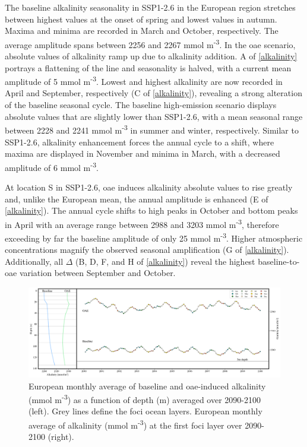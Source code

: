 The baseline alkalinity seasonality in SSP1-2.6 in the European region stretches between highest values at the onset of spring and lowest values in autumn. Maxima and minima are recorded in March and October, respectively. The average amplitude spans between 2256 and 2267 mmol m\textsuperscript{-3}. In the \ac{oae} scenario, absolute values of alkalinity ramp up due to alkalinity addition. A of \cref{alkalinity} portrays a flattening of the line and seasonality is halved, with a current mean amplitude of 5 mmol m\textsuperscript{-3}. Lowest and highest alkalinity are now recorded in April and September, respectively (C of \cref{alkalinity}), revealing a strong alteration of the baseline seasonal cycle. The baseline high-emission scenario displays absolute values that are slightly lower than SSP1-2.6, with a mean seasonal range between 2228 and 2241 mmol m\textsuperscript{-3} in summer and winter, respectively. Similar to SSP1-2.6, alkalinity enhancement forces the annual cycle to a shift, where maxima are displayed in November and minima in March, with a decreased amplitude of 6 mmol m\textsuperscript{-3}. 

At location S in SSP1-2.6, \ac{oae} induces alkalinity absolute values to rise greatly and, unlike the European mean, the annual amplitude is enhanced (E of \cref{alkalinity}). The annual cycle shifts to high peaks in October and bottom peaks in April with an average range between 2988 and 3203 mmol m\textsuperscript{-3}, therefore exceeding by far the baseline amplitude of only 25 mmol m\textsuperscript{-3}. Higher atmospheric  concentrations magnify the observed seasonal amplification (G of \cref{alkalinity}). Additionally, all $\Delta$ (B, D, F, and H of \cref{alkalinity}) reveal the highest baseline-to-\ac{oae} variation between September and October.

\begin{figure}[H]
\caption[European monthly average of baseline and \texorpdfstring{OAE}{OAE}-induced alkalinity as a function of depth]{European monthly average of baseline and \ac{oae}-induced alkalinity (mmol m\textsuperscript{-3}) as a function of depth (m) averaged over 2090-2100 (left). Grey lines define the \ac{foci} ocean layers. European monthly average of alkalinity (mmol m\textsuperscript{-3}) at the first \ac{foci} layer over 2090-2100 (right).}
\label{EUalkalinitysurface}
\centering
\includegraphics[width=15cm]{fig/3_Results/Alkalinity/EUAlk_depthprof.png}

\end{figure}

